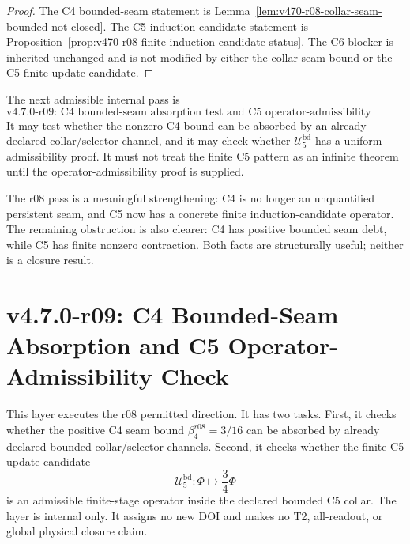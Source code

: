 \begin{proof}
The C4 bounded-seam statement is Lemma~\ref{lem:v470-r08-collar-seam-bounded-not-closed}.
The C5 induction-candidate statement is
Proposition~\ref{prop:v470-r08-finite-induction-candidate-status}.  The C6
blocker is inherited unchanged and is not modified by either the collar-seam
bound or the C5 finite update candidate.
\end{proof}

\begin{corollary}
\label{cor:v470-r08-permitted-r09-direction}
The next admissible internal pass is
\[
\text{v4.7.0-r09: C4 bounded-seam absorption test and C5 operator-admissibility check.}
\]
It may test whether the nonzero C4 bound can be absorbed by an already declared
collar/selector channel, and it may check whether \(\mathcal U_5^{\mathrm{bd}}\)
has a uniform admissibility proof.  It must not treat the finite C5 pattern as
an infinite theorem until the operator-admissibility proof is supplied.
\end{corollary}

\begin{remark}[r08 summary]
The r08 pass is a meaningful strengthening: C4 is no longer an unquantified
persistent seam, and C5 now has a concrete finite induction-candidate operator.
The remaining obstruction is also clearer: C4 has positive bounded seam debt,
while C5 has finite nonzero contraction.  Both facts are structurally useful;
neither is a closure result.
\end{remark}


\section{v4.7.0-r09: C4 Bounded-Seam Absorption and C5 Operator-Admissibility Check}
\label{sec:v470-r09-c4-absorption-c5-operator-admissibility}

This layer executes the r08 permitted direction.  It has two tasks.  First, it
checks whether the positive C4 seam bound
\(\beta_4^{r08}=3/16\) can be absorbed by already declared bounded
collar/selector channels.  Second, it checks whether the finite C5 update
candidate
\[
\mathcal U_5^{\mathrm{bd}}:\Phi\longmapsto \frac34\Phi
\]
is an admissible finite-stage operator inside the declared bounded C5 collar.
The layer is internal only.  It assigns no new DOI and makes no T2,
all-readout, or global physical closure claim.

